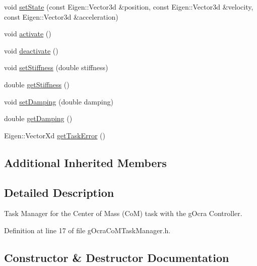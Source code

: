 \begin{DoxyCompactItemize}
\item 
void \hyperlink{classgocra_1_1gOcraCoMTaskManager_a652fe54cce0b1e88aba3ed0b07da1bc4}{set\+State} (const Eigen\+::\+Vector3d \&position, const Eigen\+::\+Vector3d \&velocity, const Eigen\+::\+Vector3d \&acceleration)
\item 
void \hyperlink{classgocra_1_1gOcraCoMTaskManager_a0a2649bf8ce377a8af44e13a3571f670}{activate} ()
\item 
void \hyperlink{classgocra_1_1gOcraCoMTaskManager_aec4b5fefd71eabb7ec71d0801a5bbf5f}{deactivate} ()
\item 
void \hyperlink{classgocra_1_1gOcraCoMTaskManager_a27aec28ef1c0f7cc3e49e431c87ffe70}{set\+Stiffness} (double stiffness)
\item 
double \hyperlink{classgocra_1_1gOcraCoMTaskManager_afc838311dae748d89ef76749192b2153}{get\+Stiffness} ()
\item 
void \hyperlink{classgocra_1_1gOcraCoMTaskManager_afe1e6ca547d469d3b504fccad7a9567d}{set\+Damping} (double damping)
\item 
double \hyperlink{classgocra_1_1gOcraCoMTaskManager_a9df173026478a08d1afa64f32fab2c01}{get\+Damping} ()
\item 
Eigen\+::\+Vector\+Xd \hyperlink{classgocra_1_1gOcraCoMTaskManager_a48cd88dc2fa3db834d3d4a17d39a8c30}{get\+Task\+Error} ()
\end{DoxyCompactItemize}
\subsection*{Additional Inherited Members}


\subsection{Detailed Description}
Task Manager for the Center of Mass (CoM) task with the g\+Ocra Controller. 



Definition at line 17 of file g\+Ocra\+Co\+M\+Task\+Manager.\+h.



\subsection{Constructor \& Destructor Documentation}
